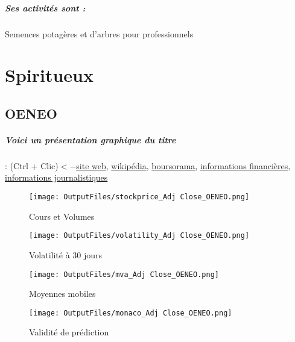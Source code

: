\documentclass[11pt,a4paper]{report}%
\begin{document}
\paragraph{Ses activités sont : } Semences potagères et d'arbres pour professionnels  
    
    \newpage\chapter{Spiritueux}


\section{OENEO}

\paragraph{Voici un présentation graphique du titre} : (Ctrl + Clic)$<-$\href{https://oeneo.com/espace-investisseurs/}{site web}, \href{https://fr.wikipedia.org/wiki/%C5%92neo}{wikipédia}, \href{https://www.boursorama.com/cours/1rPSBT}{boursorama}, \href{https://www.qwant.com/?q=site:https:%2f%2fwww.easybourse.com%2faction-societe%2fOENEO&t=web&client=ext-firefox-hp}{informations financières}, \href{https://bourse.lerevenu.com/cours-de-bourse/fiche-valeur-synthese/OENEO/SBT-FR}{informations journalistiques}
\begin{figure}[!htb]
   \begin{minipage}{0.5\textwidth}
     \centering
     \texttt{[image: OutputFiles/stockprice\_Adj Close\_OENEO.png]}
     \caption{Cours et Volumes}\label{Fig:price_OENEO}
   \end{minipage}\hfill
   \begin{minipage}{0.5\textwidth}
     \centering
     \texttt{[image: OutputFiles/volatility\_Adj Close\_OENEO.png]}
     \caption{Volatilité à 30 jours}\label{Fig:volat_OENEO}
   \end{minipage}
\end{figure}
\begin{figure}[!htb]
   \begin{minipage}{0.5\textwidth}
     \centering
     \texttt{[image: OutputFiles/mva\_Adj Close\_OENEO.png]}
     \caption{Moyennes mobiles}\label{Fig:mva_OENEO}
   \end{minipage}\hfill
   \begin{minipage}{0.5\textwidth}
     \centering
     \texttt{[image: OutputFiles/monaco\_Adj Close\_OENEO.png]}
     \caption{Validité de prédiction}\label{Fig:prediction_OENEO}
   \end{minipage}
\end{figure}
\end{document}
